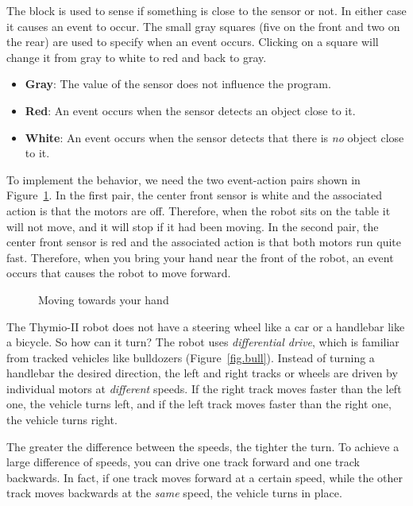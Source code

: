 The block  is used to sense if something is close to the
sensor or not. In either case it causes an event to occur. The small
gray squares (five on the front and two on the rear) are used to specify
when an event occurs. Clicking on a square will change it from gray to
white to red and back to gray.

\begin{itemize}
\item \textbf{Gray}: The value of the sensor does not influence the
program.
\item \textbf{Red}: An event occurs when the sensor detects an object
close to it.
\item \textbf{White}: An event occurs when the sensor detects that there
is \emph{no} object close to it.
\end{itemize}

To implement the behavior, we need the two event-action pairs shown in
Figure~\ref{fig.follow-hand}. In the first pair, the center front sensor
is white and the associated action is that the motors are off.
Therefore, when the robot sits on the table it will not move, and it
will stop if it had been moving. In the second pair, the center front
sensor is red and the associated action is that both motors run quite
fast. Therefore, when you bring your hand near the front of the robot,
an event occurs that causes the robot to move forward.

\begin{figure}
\begin{center}
\caption{Moving towards your hand}\label{fig.follow-hand}
\end{center}
\end{figure}



The Thymio-II robot does not have a steering wheel like a car or a
handlebar like a bicycle. So how can it turn? The robot uses
\emph{differential drive}, which is familiar from tracked vehicles like
bulldozers (Figure~\ref{fig.bull}). Instead of turning a handlebar the
desired direction, the left and right tracks or wheels are driven by
individual motors at \emph{different} speeds. If the right track moves
faster than the left one, the vehicle turns left, and if the left track
moves faster than the right one, the vehicle turns right.

The greater the difference between the speeds, the tighter the turn. To
achieve a large difference of speeds, you can drive one track forward
and one track backwards. In fact, if one track moves forward at a
certain speed, while the other track moves backwards at the \emph{same}
speed, the vehicle turns in place.

